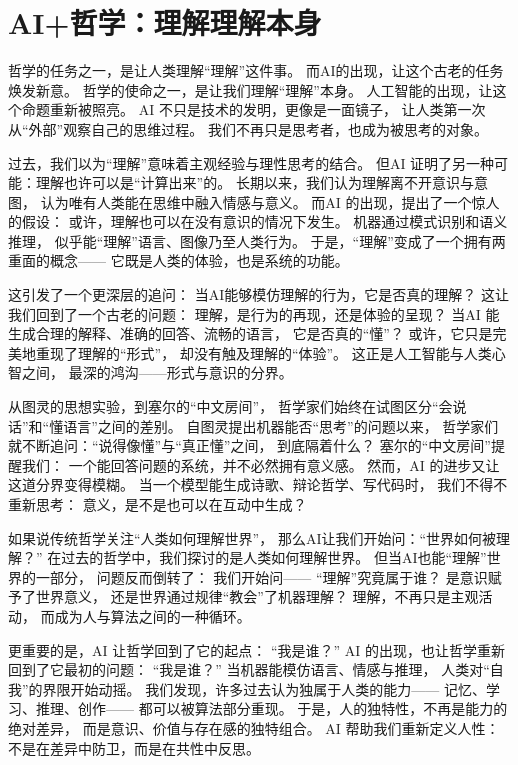 \section{AI+哲学：理解理解本身}

哲学的任务之一，是让人类理解“理解”这件事。  
而AI的出现，让这个古老的任务焕发新意。  
哲学的使命之一，是让我们理解“理解”本身。  
人工智能的出现，让这个命题重新被照亮。  
AI 不只是技术的发明，更像是一面镜子，  
让人类第一次从“外部”观察自己的思维过程。  
我们不再只是思考者，也成为被思考的对象。

过去，我们以为“理解”意味着主观经验与理性思考的结合。  
但AI 证明了另一种可能：理解也许可以是“计算出来”的。  
长期以来，我们认为理解离不开意识与意图，  
认为唯有人类能在思维中融入情感与意义。  
而AI 的出现，提出了一个惊人的假设：  
或许，理解也可以在没有意识的情况下发生。  
机器通过模式识别和语义推理，  
似乎能“理解”语言、图像乃至人类行为。  
于是，“理解”变成了一个拥有两重面的概念——  
它既是人类的体验，也是系统的功能。

这引发了一个更深层的追问：  
当AI能够模仿理解的行为，它是否真的理解？  
这让我们回到了一个古老的问题：  
理解，是行为的再现，还是体验的呈现？  
当AI 能生成合理的解释、准确的回答、流畅的语言，  
它是否真的“懂”？  
或许，它只是完美地重现了理解的“形式”，  
却没有触及理解的“体验”。  
这正是人工智能与人类心智之间，  
最深的鸿沟——形式与意识的分界。

从图灵的思想实验，到塞尔的“中文房间”，  
哲学家们始终在试图区分“会说话”和“懂语言”之间的差别。  
自图灵提出机器能否“思考”的问题以来，  
哲学家们就不断追问：“说得像懂”与“真正懂”之间，  
到底隔着什么？  
塞尔的“中文房间”提醒我们：  
一个能回答问题的系统，并不必然拥有意义感。  
然而，AI 的进步又让这道分界变得模糊。  
当一个模型能生成诗歌、辩论哲学、写代码时，  
我们不得不重新思考：  
意义，是不是也可以在互动中生成？

如果说传统哲学关注“人类如何理解世界”，  
那么AI让我们开始问：“世界如何被理解？”  
在过去的哲学中，我们探讨的是人类如何理解世界。  
但当AI也能“理解”世界的一部分，  
问题反而倒转了：  
我们开始问——  
“理解”究竟属于谁？  
是意识赋予了世界意义，  
还是世界通过规律“教会”了机器理解？  
理解，不再只是主观活动，  
而成为人与算法之间的一种循环。

更重要的是，AI 让哲学回到了它的起点：  
“我是谁？”  
AI 的出现，也让哲学重新回到了它最初的问题：  
“我是谁？”  
当机器能模仿语言、情感与推理，  
人类对“自我”的界限开始动摇。  
我们发现，许多过去认为独属于人类的能力——  
记忆、学习、推理、创作——  
都可以被算法部分重现。  
于是，人的独特性，不再是能力的绝对差异，  
而是意识、价值与存在感的独特组合。  
AI 帮助我们重新定义人性：  
不是在差异中防卫，而是在共性中反思。

